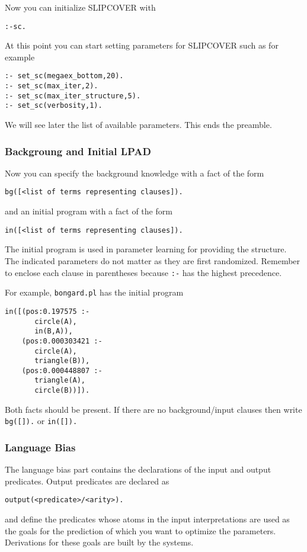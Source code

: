 \documentclass[a4paper,10pt]{article}
\begin{document}
Now you can initialize SLIPCOVER with
\begin{verbatim}
:-sc.
\end{verbatim}
At this point you can start setting parameters for SLIPCOVER such as for example
\begin{verbatim}
:- set_sc(megaex_bottom,20).
:- set_sc(max_iter,2).
:- set_sc(max_iter_structure,5).
:- set_sc(verbosity,1).
\end{verbatim}
We will see later the list of available parameters.
This ends the preamble.

\subsubsection{Backgroung and Initial LPAD}
%
Now you can specify the background knowledge with a 
fact of the form 
\begin{verbatim}
bg([<list of terms representing clauses]).
\end{verbatim}
and an initial program with a fact of the form 
\begin{verbatim}
in([<list of terms representing clauses]).
\end{verbatim}
The initial program is used in parameter learning for providing 
the structure. The indicated parameters do not matter as they are first randomized.
Remember to enclose each clause in parentheses because \verb|:-| has the highest precedence.

For example, \verb|bongard.pl| has the initial program 
\begin{verbatim}
in([(pos:0.197575 :-
       circle(A),
       in(B,A)),
    (pos:0.000303421 :-
       circle(A),
       triangle(B)), 
    (pos:0.000448807 :-
       triangle(A),
       circle(B))]).
\end{verbatim}
Both facts should be present. If there are no background/input clauses then write \verb|bg([]).| or \verb|in([]).|


\subsubsection{Language Bias}
%
The language bias part contains the declarations of the input and output predicates.
Output predicates are declared as
\begin{verbatim}
output(<predicate>/<arity>).
\end{verbatim}
and define the predicates whose atoms in the input interpretations are used as the goals for the prediction of which you want to optimize the parameters. Derivations for these goals are built by the systems.
\end{document}
